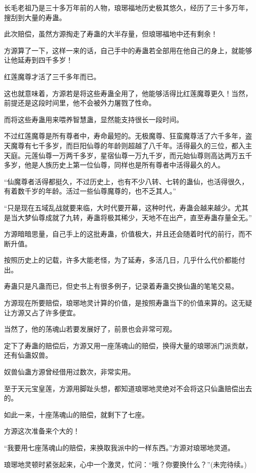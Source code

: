 \begin{this_body}
长毛老祖乃是三十多万年前的人物，琅琊福地历史极其悠久，经历了三十多万年，搜刮到大量的寿蛊。

此次赔偿，虽然方源掏走了寿蛊的大半存量，但琅琊福地中还有剩余！

方源算了一下，这样一来的话，自己手中的寿蛊若全部用在他自己的身上，就能够让他延寿到四千多岁！

红莲魔尊才活了三千多年而已。

这也就意味着，方源若是将这些寿蛊全用了，他能够活得比红莲魔尊更久！当然，前提还是这段时间里，他不会被外力屠戮了性命。

而将这些寿蛊用来喂养智慧蛊，显然能支持很长一段时间。

不过红莲魔尊是所有尊者中，寿命最短的。无极魔尊、狂蛮魔尊活了六千多年，盗天魔尊有七千多岁，而巨阳仙尊的年龄则超越了八千年。活得最久的三位，都入主天庭。元莲仙尊一万两千多岁，星宿仙尊一万九千岁，而元始仙尊则高达两万五千多岁，他是人族历史上第一位仙尊，同样也是所有尊者中活得最久的人。

“仙魔尊者活得都挺久，不过历史上，也有不少八转、七转的蛊仙，也活得很久，有着数千岁的年龄。活过一些仙尊魔尊的，也不乏其人。”

“只是现在五域乱战就要来临，大时代要开幕，这种时代，寿蛊会越来越少。尤其是当大梦仙尊成就了九转，寿蛊将极其稀少，天地不在出产，直至寿蛊存量全无。”

方源暗暗思量，自己手上的这批寿蛊，价值极大，并且还会随着时代的前行，而不断升值。

按照历史上的记载，许多大能老怪，为了延寿，多活几日，几乎什么代价都能付出。

寿蛊只是凡蛊而已，但史书上有很多例子，记录着寿蛊交换仙蛊的笔笔交易。

方源现在所要赔偿，琅琊地灵计算的价值，是按照寿蛊当下的价值来算的。这无疑让方源又占了许多便宜。

当然了，他的荡魂山若要发展好了，前景也会非常可观。

定下了寿蛊的赔偿后，方源又用一座荡魂山的赔偿，换得大量的琅琊派门派贡献，还有仙蛊奴兽。

奴兽仙蛊方源曾经借用过数次，非常实用。

至于天元宝皇莲，方源用脚趾头想，都知道琅琊地灵绝对不会将这只仙蛊赔偿出去的。

如此一来，十座荡魂山的赔偿，就剩下了七座。

方源这次准备来个大的！

“我要用七座荡魂山的赔偿，来换取我派中的一样东西。”方源对琅琊地灵道。

琅琊地灵顿时紧张起来，心中一个激灵，忙问：“哦？你要换什么？”(未完待续。)

\end{this_body}

